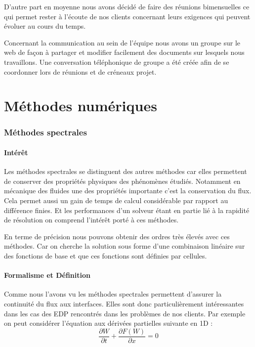 \documentclass[a4paper,12pt]{report}
\theoremstyle{break}
\begin{document}
    D’autre part en moyenne nous avons décidé de faire des réunions bimensuelles ce qui permet rester à l’écoute de nos clients concernant leurs exigences qui peuvent évoluer au cours du temps. 
    
    Concernant la communication au sein de l’équipe nous avons un groupe sur le web de façon à partager et modifier facilement des documents sur lesquels nous travaillons. Une conversation téléphonique de groupe a été créée afin de se coordonner lors de réunions et de créneaux projet. 

\part{Méthodes numériques}
\section{Méthodes spectrales}
\subsection{Intérêt}

Les méthodes spectrales se distinguent des autres méthodes car elles permettent de conserver des propriétés physiques des phénomènes étudiés. Notamment en mécanique des fluides une des propriétés importante c'est la conservation du flux.
Cela permet aussi un gain de temps de calcul considérable par rapport au différence finies. Et les performances d'un solveur étant en partie lié à la rapidité de résolution on comprend l'intérêt porté à ces méthodes. 

En terme de précision nous pouvons obtenir des ordres très élevés avec ces méthodes. Car on cherche la solution sous forme d'une combinaison linéaire sur des fonctions de base et que ces fonctions sont définies par cellules. 

\subsection{Formalisme et Définition}

Comme nous l'avons vu les méthodes spectrales permettent d'assurer la continuité du flux aux interfaces. Elles sont donc particulièrement intéressantes dans les cas des EDP rencontrés dans les problèmes de nos clients. Par exemple on peut considérer l'équation aux dérivées partielles suivante en 1D : 
\begin{equation}
\frac{\partial W}{\partial t}+\frac{\partial F(W)}{\partial x}=0 \nonumber
\end{equation}
\end{document}
